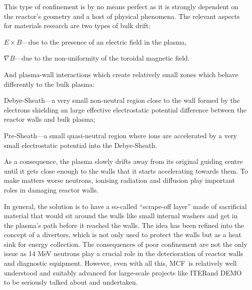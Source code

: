 \documentclass[12pt, a4paper]{article}
\newcommand{\mc}{MCF}
\newcommand{\ite}{ITER}
\begin{document}
			This type of confinement is by no means perfect as it is strongly dependent on the reactor's geometry and a host of physical phenomena. The relevant aspects for materials research are two types of bulk drift:
			\begin{inparaenum}
				\item $E \times B$---due to the presence of an electric field in the plasma,
				\item $\nabla B$---due to the non-uniformity of the toroidal magnetic field.
			\end{inparaenum}
			And plasma-wall interactions which create relatively small zones which behave differently to the bulk plasma:
			\begin{inparaenum}
				\item Debye-Sheath---a very small non-neutral region close to the wall formed by the electrons shielding an large effective electrostatic potential difference between the reactor walls and bulk plasma;
				\item Pre-Sheath---a small quasi-neutral region where ions are accelerated by a very small electrostatic potential into the Debye-Sheath.
			\end{inparaenum}
			As a consequence, the plasma slowly drifts away from its original guiding centre until it gets close enough to the walls that it starts accelerating towards them. To make matters worse neutrons, ionising radiation and diffusion play important roles in damaging reactor walls.
			
			In general, the solution is to have a so-called ``scrape-off layer'' made of sacrificial material that would sit around the walls like small internal washers and get in the plasma's path before it reached the walls. The idea has been refined into the concept of a divertors, which is not only used to protect the walls but as a heat sink for energy collection. The consequences of poor confinement are not the only issue as 14 MeV neutrons play a crucial role in the deterioration of reactor walls and diagnostic equipment. However, even with all this, \mc~is relatively well understood and suitably advanced for large-scale projects like \ite and DEMO to be seriously talked about and undertaken.
\end{document}
